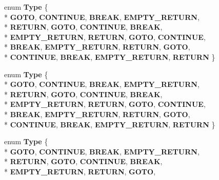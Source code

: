 \begin{DoxyCompactItemize}
\item 
enum {\bfseries Type} \{ \\*
{\bfseries G\-O\-T\-O}, 
{\bfseries C\-O\-N\-T\-I\-N\-U\-E}, 
{\bfseries B\-R\-E\-A\-K}, 
{\bfseries E\-M\-P\-T\-Y\-\_\-\-R\-E\-T\-U\-R\-N}, 
\\*
{\bfseries R\-E\-T\-U\-R\-N}, 
{\bfseries G\-O\-T\-O}, 
{\bfseries C\-O\-N\-T\-I\-N\-U\-E}, 
{\bfseries B\-R\-E\-A\-K}, 
\\*
{\bfseries E\-M\-P\-T\-Y\-\_\-\-R\-E\-T\-U\-R\-N}, 
{\bfseries R\-E\-T\-U\-R\-N}, 
{\bfseries G\-O\-T\-O}, 
{\bfseries C\-O\-N\-T\-I\-N\-U\-E}, 
\\*
{\bfseries B\-R\-E\-A\-K}, 
{\bfseries E\-M\-P\-T\-Y\-\_\-\-R\-E\-T\-U\-R\-N}, 
{\bfseries R\-E\-T\-U\-R\-N}, 
{\bfseries G\-O\-T\-O}, 
\\*
{\bfseries C\-O\-N\-T\-I\-N\-U\-E}, 
{\bfseries B\-R\-E\-A\-K}, 
{\bfseries E\-M\-P\-T\-Y\-\_\-\-R\-E\-T\-U\-R\-N}, 
{\bfseries R\-E\-T\-U\-R\-N}
 \}
\item 
enum {\bfseries Type} \{ \\*
{\bfseries G\-O\-T\-O}, 
{\bfseries C\-O\-N\-T\-I\-N\-U\-E}, 
{\bfseries B\-R\-E\-A\-K}, 
{\bfseries E\-M\-P\-T\-Y\-\_\-\-R\-E\-T\-U\-R\-N}, 
\\*
{\bfseries R\-E\-T\-U\-R\-N}, 
{\bfseries G\-O\-T\-O}, 
{\bfseries C\-O\-N\-T\-I\-N\-U\-E}, 
{\bfseries B\-R\-E\-A\-K}, 
\\*
{\bfseries E\-M\-P\-T\-Y\-\_\-\-R\-E\-T\-U\-R\-N}, 
{\bfseries R\-E\-T\-U\-R\-N}, 
{\bfseries G\-O\-T\-O}, 
{\bfseries C\-O\-N\-T\-I\-N\-U\-E}, 
\\*
{\bfseries B\-R\-E\-A\-K}, 
{\bfseries E\-M\-P\-T\-Y\-\_\-\-R\-E\-T\-U\-R\-N}, 
{\bfseries R\-E\-T\-U\-R\-N}, 
{\bfseries G\-O\-T\-O}, 
\\*
{\bfseries C\-O\-N\-T\-I\-N\-U\-E}, 
{\bfseries B\-R\-E\-A\-K}, 
{\bfseries E\-M\-P\-T\-Y\-\_\-\-R\-E\-T\-U\-R\-N}, 
{\bfseries R\-E\-T\-U\-R\-N}
 \}
\item 
enum {\bfseries Type} \{ \\*
{\bfseries G\-O\-T\-O}, 
{\bfseries C\-O\-N\-T\-I\-N\-U\-E}, 
{\bfseries B\-R\-E\-A\-K}, 
{\bfseries E\-M\-P\-T\-Y\-\_\-\-R\-E\-T\-U\-R\-N}, 
\\*
{\bfseries R\-E\-T\-U\-R\-N}, 
{\bfseries G\-O\-T\-O}, 
{\bfseries C\-O\-N\-T\-I\-N\-U\-E}, 
{\bfseries B\-R\-E\-A\-K}, 
\\*
{\bfseries E\-M\-P\-T\-Y\-\_\-\-R\-E\-T\-U\-R\-N}, 
{\bfseries R\-E\-T\-U\-R\-N}, 
{\bfseries G\-O\-T\-O}, 

\end{DoxyCompactItemize}
